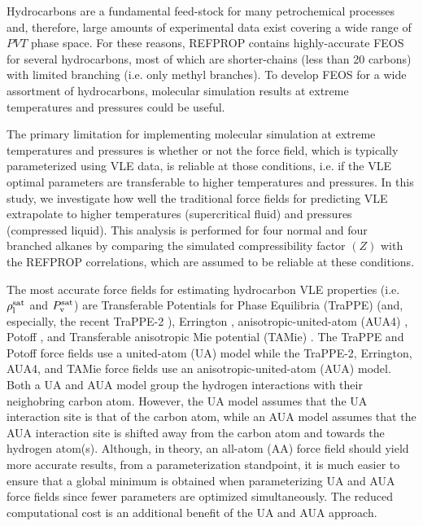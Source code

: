 \documentclass[journal=jctc,manuscript=article]{achemso}
\begin{document}

Hydrocarbons are a fundamental feed-stock for many petrochemical processes and, therefore, large amounts of experimental data exist covering a wide range of $PVT$ phase space. For these reasons, REFPROP contains highly-accurate FEOS for several hydrocarbons, most of which are shorter-chains (less than 20 carbons) with limited branching (i.e. only methyl branches). To develop FEOS for a wide assortment of hydrocarbons, molecular simulation results at extreme temperatures and pressures could be useful. 

The primary limitation for implementing molecular simulation at extreme temperatures and pressures is whether or not the force field, which is typically parameterized using VLE data, is reliable at those conditions, i.e. if the VLE optimal parameters are transferable to higher temperatures and pressures. In this study, we investigate how well the traditional force fields for predicting VLE extrapolate to higher temperatures (supercritical fluid) and pressures (compressed liquid). This analysis is performed for four normal and four branched alkanes by comparing the simulated compressibility factor $(Z)$ with the REFPROP correlations, which are assumed to be reliable at these conditions.

The most accurate force fields for estimating hydrocarbon VLE properties (i.e. $\rho_{\rm l}^{\rm sat}$ and $P_{\rm v}^{\rm sat}$) are Transferable Potentials for Phase Equilibria (TraPPE) \cite{TraPPE,Martin1999} (and, especially, the recent TraPPE-2 \cite{TraPPEUA2}), Errington \cite{Exp6}, anisotropic-united-atom (AUA4) \cite{AUA4,Bourasseau2002}, Potoff \cite{Mie,Potoff_branched}, and Transferable anisotropic Mie potential (TAMie) \cite{TAMie,Weidler2016}. The TraPPE and Potoff force fields use a united-atom (UA) model while the TraPPE-2, Errington, AUA4, and TAMie force fields use an anisotropic-united-atom (AUA) model. Both a UA and AUA model group the hydrogen interactions with their neighobring carbon atom. However, the UA model assumes that the UA interaction site is that of the carbon atom, while an AUA model assumes that the AUA interaction site is shifted away from the carbon atom and towards the hydrogen atom(s). Although, in theory, an all-atom (AA) force field should yield more accurate results, from a parameterization standpoint, it is much easier to ensure that a global minimum is obtained when parameterizing UA and AUA force fields since fewer parameters are optimized simultaneously. The reduced computational cost is an additional benefit of the UA and AUA approach.
\end{document}
